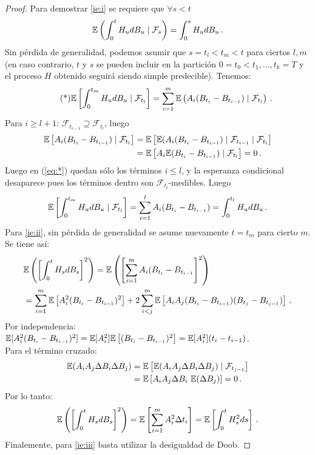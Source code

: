 \begin{proof}
\gris
Para demostrar \ref{ie:i} se requiere que $\forall s < t$
\begin{equation*}
        \mathbb{E} \left( \int_{0}^{t} H_u dB_u  \mid  \mathcal{F}_s \right)  = \int_{0}^{s} H_u dB_u\,.
\end{equation*}
Sin pérdida de generalidad, podemos asumir que $s = t_{l} < t_m < t$ para ciertos $l,m$ (en caso contrario, $t$ y $s$ se pueden incluir en la partición $0 = t_0 < t_1, \ldots, t_k = T$ y el proceso $H$ obtenido seguirá siendo simple predecible). Tenemos:
\begin{equation*}
    \label{eq:*}
    \tag{*}
    \mathbb{E} \left[ \int_{0}^{t_m} H_u dB_u \mid \mathcal{F}_{t_l} \right] = \sum_{i=1}^{m} \mathbb{E} \left( A_i (B_{t_i} - B_{t_{i-1}}) \mid  \mathcal{F}_{t_l} \right)\,. 
\end{equation*}
Para $i \ge  l+1$: $\mathcal{F}_{t_{i-1}} \supseteq \mathcal{F}_{t_l}$, luego 
\begin{align*}
    \mathbb{E} \left[ A_i (B_{t_i} - B_{t_{i-1}}) \mid \mathcal{F}_{t_l} \right]  
    &= \mathbb{E} \left[ \mathbb{E} (A_{i}(B_{t_i} - B_{t_{i-1}}) \mid \mathcal{F}_{t_{i-1}}  \mid  \mathcal{F}_{t_l}  \right]  \\ 
    &= \mathbb{E} \left[ A_{i} \mathbb{E}( B_{t_i} - B_{t_{i-1}}) \mid \mathcal{F}_{t_l}\right] = 0\,.
\end{align*}
Luego en (\ref{eq:*}) quedan sólo los términos $i \le l$, y la esperanza condicional desaparece pues
los términos dentro son $\mathcal{F}_{t_l}$-medibles. Luego
\begin{equation*}
    \mathbb{E} \left[ \int_{0}^{t_m} H_u dB_u  \mid \mathcal{F}_{t_l} \right] = \sum_{i=1}^{l} A_i (B_{t_i} -B_{t_{i-1}}) = \int_{0}^{t_l} H_u dB_u \,.
\end{equation*}
Para \ref{ie:ii}, sin pérdida de generalidad se asume nuevamente $t=t_m$ para cierto $m$. Se tiene 
así:
\begin{align*}
        &\mathbb{E} \left( \left[\int_{0}^{t} H_s dB_s \right]^2 \right)  
        = \mathbb{E} \left( \left[ \sum_{i=1}^{m} A_i(B_{t_i} -B_{t_{i-1}}\right]^2 \right) \\ 
        &= \sum_{i=1}^{m}\mathbb{E}\left[ A^2_i(B_{t_i} - B_{t_{i-1}})^2
        \right] + 2 \sum_{i<j}^{m} \mathbb{E} \left[ A_i A_j (B_{t_i}
        -B_{t_{i-1}})(B_{t_j} - B_{t_{j-1}} )  \right] \,.
\end{align*}
Por independencia: $\mathbb{E}[A_i^{2} (B_{t_i} - B_{t_{i-1}})^2 ] = \mathbb{E}[A_i^2]\mathbb{E}\left[(B_{t_i} - B_{t_{i-1}})^2\right] = \mathbb{E} [A_i^2](t_{i} - t_{i-1})$. 
\\ Para el término cruzado:
\begin{align*}
    \mathbb{E} (A_i A_j \Delta B_i \Delta B_j) 
    &= \mathbb{E} \left[ \mathbb{E} (A_i A_j \Delta B_i \Delta B_j) \mid \mathcal{F}_{t_{j-1}}\right] \\
    &= \mathbb{E} \left[ A_i A_j \Delta B_i ~ \mathbb{E} (\Delta B_j) \right] = 0\,.
\end{align*}
Por lo tanto:
\begin{equation*}
        \mathbb{E} \left( \left[ \int_{0}^{t} H_s dB_s \right]^2  \right) =
        \mathbb{E} \left[ \sum_{i=1}^{m} A_i^2 \Delta t_i \right] = \mathbb{E} \left[\int_{0}^{t} H_s^2 ds \right]\,.
\end{equation*}
Finalemente, para \ref{ie:iii} basta utilizar la desigualdad de Doob.\findem
\negro
\end{proof}
